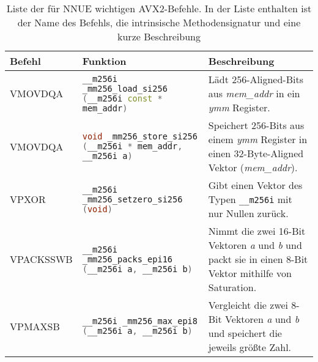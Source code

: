 \begin{table}[ht]
  \caption{Liste der für \ac{NNUE} wichtigen \ac{AVX2}-Befehle. In der Liste enthalten ist der Name des Befehls, die intrinsische Methodensignatur und eine kurze Beschreibung \cite{intelIntrinsics}}
  \label{table:nnueInstructions}
  \renewcommand{\arraystretch}{1.2}
  \centering
  \sffamily
  \begin{footnotesize}
    \begin{tabularx}{\textwidth}{l X X}
      \toprule
      \textbf{Befehl} & \textbf{Funktion}                                                                                                                                                                                    & \textbf{Beschreibung} \\
      \midrule
      VMOVDQA         & \lstinline[language=C++]{__m256i _mm256_load_si256 (__m256i const * mem_addr)} & Lädt 256-Aligned-Bits aus \emph{mem\_addr} in ein \emph{ymm} Register.                                                                                                                                                                 \\
      VMOVDQA         & \lstinline[language=C++]{void _mm256_store_si256 (__m256i * mem_addr, __m256i a)} & Speichert 256-Bits aus einem \emph{ymm} Register in einen 32-Byte-Aligned Vektor (\emph{mem\_addr}).                                                                                                                                      \\
      VPXOR           & \lstinline[language=C++]{__m256i _mm256_setzero_si256 (void)} & Gibt einen Vektor des Typen \lstinline[language=C++]{__m256i} mit nur Nullen zurück.                                                                                                                                                                        \\
      VPACKSSWB       & \lstinline[language=C++]{__m256i _mm256_packs_epi16 (__m256i a, __m256i b)} & Nimmt die zwei 16-Bit Vektoren \emph{a} und \emph{b} und packt sie in einen 8-Bit Vektor mithilfe von Saturation.                                                                                                                           \\
      VPMAXSB         & \lstinline[language=C++]{__m256i _mm256_max_epi8 (__m256i a, __m256i b)}    & Vergleicht die zwei 8-Bit Vektoren \emph{a} und \emph{b} und speichert die jeweils größte Zahl.                                                                                                                                                 \\

\end{tabularx}
\end{footnotesize}
\end{table}
